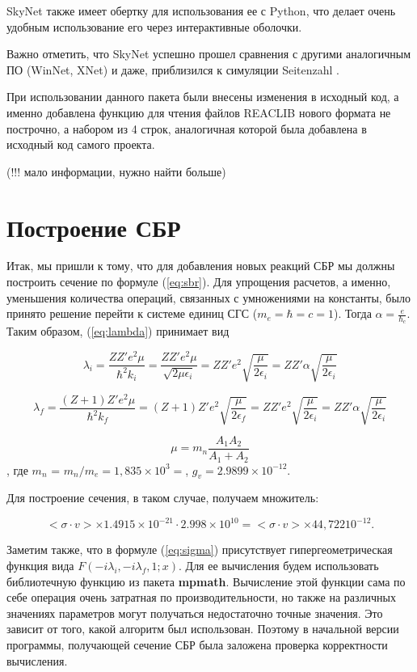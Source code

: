 \documentclass[%
master,    %
natbib,      %
subf,        %
href,        %
colorlinks,  %
]{disser}
\begin{document}
SkyNet также имеет обертку для использования ее с Python, что делает очень удобным использование его через интерактивные оболочки.

Важно отметить, что SkyNet успешно прошел сравнения с другими аналогичным ПО (WinNet, XNet) и даже, приблизился к симуляции Seitenzahl \cite{simulation}.

При использовании данного пакета были внесены изменения в исходный код, а именно добавлена функцию для чтения файлов REACLIB нового формата не построчно, а набором из 4 строк, аналогичная которой была добавлена в исходный код самого проекта.

(!!! мало информации, нужно найти больше)

\section{Построение СБР}

Итак, мы пришли к тому, что для добавления новых реакций СБР мы должны построить сечение по формуле (\ref{eq:sbr}). Для упрощения расчетов, а именно, уменьшения количества операций, связанных с умножениями на константы, было принято решение перейти к системе единиц СГС ($m_e = \hbar = c = 1$). Тогда $\alpha = \frac{e}{\hbar_c}$. Таким образом, (\ref{eq:lambda}) принимает вид

\begin{equation}
\lambda_i = \frac{Z Z' e^2 \mu}{\hbar^2 k_i} = \frac{Z Z' e^2 \mu}{\sqrt{2\mu \epsilon_i}} = Z Z' e^2 \sqrt{\frac{\mu}{2 \epsilon_i}} = Z Z' \alpha \sqrt{\frac{\mu}{2 \epsilon_i}}
\end{equation}

\begin{equation}
\lambda_f = \frac{(Z+1) Z'  e^2 \mu}{\hbar^2 k_f} = (Z + 1)Z' e^2 \sqrt{\frac{\mu}{2 \epsilon_f}} = Z Z' e^2 \sqrt{\frac{\mu}{2 \epsilon_i}} = Z Z' \alpha \sqrt{\frac{\mu}{2 \epsilon_i}}
\end{equation}

\begin{equation}
\mu = m_n \frac{A_1 A_2}{A_1 + A_2}
\end{equation}
, где $m_n$ =  $m_n/m_e = 1,835\times10^3 =$, $g_v = 2.9899 \times 10^{-12}$.

Для построение сечения, в таком случае, получаем множитель:

$$
	<\sigma \cdot v> \times 1.4915 \times 10^{-21} \cdot 2.998 \times 10^{10} = 	<\sigma \cdot v> \times 44,722 10^{-12}.
$$

Заметим также, что в формуле (\ref{eq:sigma}) присутствует гипергеометрическая функция вида $F(-i\lambda_i,-i\lambda_f,1;x)$. Для ее вычисления будем использовать библиотечную функцию из пакета \textbf{mpmath}. Вычисление этой функции сама по себе операция очень затратная по производительности, но также на различных значениях параметров могут получаться недостаточно точные значения. Это зависит от того, какой алгоритм был использован. Поэтому в начальной версии программы, получающей сечение СБР была заложена проверка корректности вычисления. 
\end{document}
